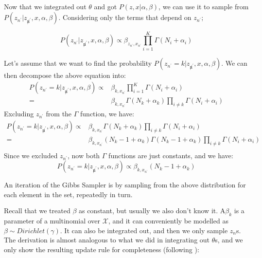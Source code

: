 \documentclass{article}%
\begin{document}
Now that we integrated out $\theta$ and got $P(z, x|\alpha, \beta)$, we can use it to sample from $P(z_{n^\prime}|z_{\not n^\prime}, x, \alpha, \beta)$. Considering only the terms that depend on $z_{n^\prime}$;

\begin{equation*}
P(z_{n^\prime}|z_{\not n^\prime}, x, \alpha, \beta) \propto \beta_{z_{n^\prime}, x_{n^\prime}}  \prod_{i=1}^K \Gamma(N_i + \alpha_i)
\end{equation*}

Let's assume that we want to find the probability $P(z_{n^\prime} = k|z_{\not n^\prime}, x, \alpha, \beta)$. We can then decompose the above equation into:
\begin{align*}
P(z_{n^\prime} = k|z_{\not n^\prime}, x, \alpha, \beta) \propto& \beta_{k, x_{n^\prime}}  \prod_{i=1}^K \Gamma(N_i + \alpha_i)\\
=&\beta_{k, x_{n^\prime}}  \Gamma(N_k + \alpha_k)\prod_{i\neq k} \Gamma(N_i + \alpha_i)
\end{align*}
Excluding $z_{n^\prime}$ from the $\Gamma$ function, we have:
\begin{align*}
P(z_{n^\prime} = k|z_{\not n^\prime}, x, \alpha, \beta) \propto&\beta_{k, x_{n^\prime}}  \Gamma(N_k + \alpha_k)\prod_{i\neq k} \Gamma(N_i + \alpha_i)\\
=& \beta_{k, x_{n^\prime}} (N_k -1 +\alpha_k ) \Gamma(N_k -1 + \alpha_k)\prod_{i\neq k} \Gamma(N_i + \alpha_i)\\
\end{align*}
Since we excluded $z_{n^\prime}$, now both $\Gamma$ functions are just constants, and we have:
\begin{equation*}
P(z_{n^\prime} = k|z_{\not n^\prime}, x, \alpha, \beta) \propto \beta_{k, x_{n^\prime}} (N_k - 1 + \alpha_k)
\end{equation*}

An iteration of the Gibbs Sampler is by sampling from the above distribution for each element in the set, repeatedly in turn.

Recall that we treated $\beta$ as constant, but usually we also don't know it. A$\beta_k$ is a parameter of a multinomial over $\mathcal{X}$, and it can conveniently be modelled as $\beta \sim Dirichlet(\gamma)$. It can also be integrated out, and then we only sample $z_n$s. The derivation is almost analogous to what we did in integrating out $\theta$s, and we only show the resulting update rule for completeness (following \cite{griffiths2004collapsed}):
\end{document}
